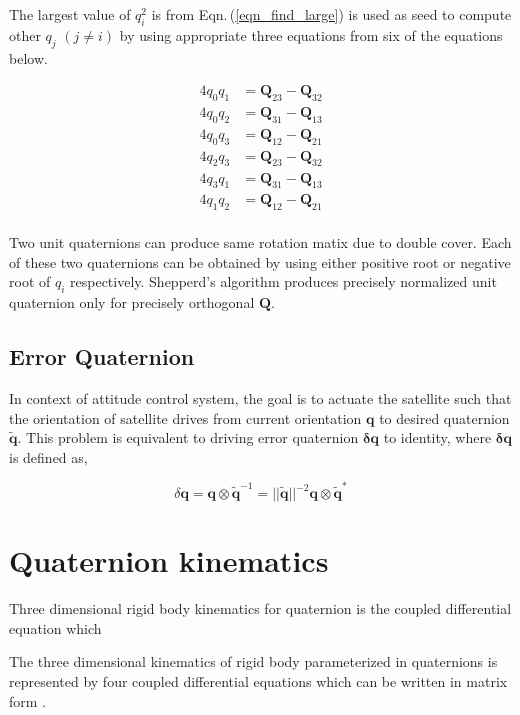 \documentclass[12pt]{article}
\begin{document}
The largest value of $q_{i}^{2}$ is from Eqn.\,(\ref{eqn_find_large}) is used as seed to compute other $q_{j}$ $(j \neq i)$ by using appropriate three equations from six of the equations below.

\begin{equation}
    \begin{split}
        4q_{0}q_{1} &= \bm{Q}_{23} - \bm{Q}_{32} \\
        4q_{0}q_{2} &= \bm{Q}_{31} - \bm{Q}_{13} \\
        4q_{0}q_{3} &= \bm{Q}_{12} - \bm{Q}_{21} \\
        4q_{2}q_{3} &= \bm{Q}_{23} - \bm{Q}_{32} \\
        4q_{3}q_{1} &= \bm{Q}_{31} - \bm{Q}_{13} \\
        4q_{1}q_{2} &= \bm{Q}_{12} - \bm{Q}_{21} \\
        \end{split}
        \label{eqn_six}
\end{equation}

Two unit quaternions can produce same rotation matix due to double cover. Each of these two quaternions can be obtained by using either positive root or negative root of $q_{i}$ respectively. Shepperd's algorithm produces precisely normalized unit quaternion only for precisely orthogonal $\bm{Q}$.

\subsection{Error Quaternion}
In context of attitude control system, the goal is to actuate the satellite such that the orientation of satellite drives from current orientation $\bm{q}$ to desired quaternion $\tilde{\bm{q}}$. This problem is equivalent to driving error quaternion $\bm{\delta q}$ to identity, where $\bm{\delta q}$ is defined as,

\begin{equation}
    \delta\bm{q} = \bm{q} \otimes \tilde{\bm{q}}^{-1} = |\!|\tilde{\bm{q}}|\!| ^{-2}\bm{q} \otimes \tilde{\bm{q}}^{*}
\end{equation}

\section{Quaternion kinematics}
Three dimensional rigid body kinematics for quaternion is the coupled differential equation which 

The three dimensional kinematics of rigid body parameterized in quaternions is represented by four coupled differential equations which can be written in matrix form \cite{hanspeter2009}.
\end{document}
